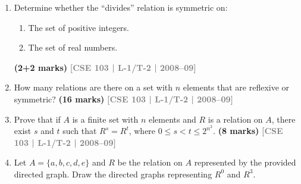 \documentclass[12pt,a3paper]{article}
\newcommand{\yr}[1]{\hfill\textcolor{gray}{\small\textbf{[#1]}}}
\newcommand{\mk}[1]{\textcolor{orange!70!black}{\small\textbf{(#1 marks)}}}
\begin{document}
\begin{enumerate}
\item Determine whether the ``divides'' relation is symmetric on:
\begin{enumerate}
  \item The set of positive integers.
  \item The set of real numbers.
\end{enumerate}
\mk{2+2} \yr{CSE 103 | L-1/T-2 | 2008--09}

\item How many relations are there on a set with $n$ elements that are reflexive or symmetric?
\mk{16} \yr{CSE 103 | L-1/T-2 | 2008--09}


\item Prove that if $A$ is a finite set with $n$ elements and $R$ is a relation on $A$, there exist $s$ and $t$ such that $R^s = R^t$, where $0 \leq s < t \leq 2^{n^2}$.
\mk{8} \yr{CSE 103 | L-1/T-2 | 2008--09}

\item Let $A = \{a, b, c, d, e\}$ and $R$ be the relation on $A$ represented by the provided directed graph. Draw the directed graphs representing $R^0$ and $R^3$.

\begin{center}
\end{center}


\end{enumerate}
\end{document}
